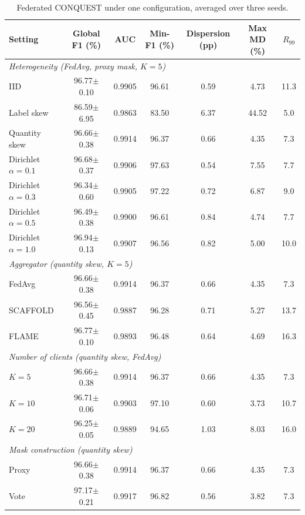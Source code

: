 \documentclass[conference]{IEEEtran}
\begin{document}
\begin{table}[!t]
\centering
\caption{Federated CONQUEST under one configuration, averaged over three seeds.}
\label{tab:fl_performance_extended}
\setlength{\tabcolsep}{4pt}
\renewcommand{\arraystretch}{1.05}
\begin{tabular}{lcccccc}
\hline\toprule
\textbf{Setting} & \textbf{Global F1 (\%)} & \textbf{AUC} & \textbf{Min-F1 (\%)} & \textbf{Dispersion (pp)} & \textbf{Max MD (\%)} & \textbf{$R_{99}$} \\
\hline\toprule
\multicolumn{7}{l}{\textit{Heterogeneity (FedAvg, proxy mask, $K{=}5$)}} \\
IID & 96.77$\pm$0.10 & 0.9905 & 96.61 & 0.59 & 4.73 & 11.3 \\
Label skew & 86.59$\pm$6.95 & 0.9863 & 83.50 & 6.37 & 44.52 & 5.0 \\
Quantity skew & 96.66$\pm$0.38 & 0.9914 & 96.37 & 0.66 & 4.35 & 7.3 \\
Dirichlet $\alpha{=}0.1$ & 96.68$\pm$0.37 & 0.9906 & 97.63 & 0.54 & 7.55 & 7.7 \\
Dirichlet $\alpha{=}0.3$ & 96.34$\pm$0.60 & 0.9905 & 97.22 & 0.72 & 6.87 & 9.0 \\
Dirichlet $\alpha{=}0.5$ & 96.49$\pm$0.38 & 0.9900 & 96.61 & 0.84 & 4.74 & 7.7 \\
Dirichlet $\alpha{=}1.0$ & 96.94$\pm$0.13 & 0.9907 & 96.56 & 0.82 & 5.00 & 10.0 \\
\midrule
\multicolumn{7}{l}{\textit{Aggregator (quantity skew, $K{=}5$)}} \\
FedAvg & 96.66$\pm$0.38 & 0.9914 & 96.37 & 0.66 & 4.35 & 7.3 \\
SCAFFOLD & 96.56$\pm$0.45 & 0.9887 & 96.28 & 0.71 & 5.27 & 13.7 \\
FLAME & 96.77$\pm$0.10 & 0.9893 & 96.48 & 0.64 & 4.69 & 16.3 \\
\midrule
\multicolumn{7}{l}{\textit{Number of clients (quantity skew, FedAvg)}} \\
$K{=}5$ & 96.66$\pm$0.38 & 0.9914 & 96.37 & 0.66 & 4.35 & 7.3 \\
$K{=}10$ & 96.71$\pm$0.06 & 0.9903 & 97.10 & 0.60 & 3.73 & 10.7 \\
$K{=}20$ & 96.25$\pm$0.05 & 0.9889 & 94.65 & 1.03 & 8.03 & 16.0 \\
\midrule
\multicolumn{7}{l}{\textit{Mask construction (quantity skew)}} \\
Proxy & 96.66$\pm$0.38 & 0.9914 & 96.37 & 0.66 & 4.35 & 7.3 \\
Vote & 97.17$\pm$0.21 & 0.9917 & 96.82 & 0.56 & 3.82 & 7.3 \\

\end{tabular}
\end{table}
\end{document}
